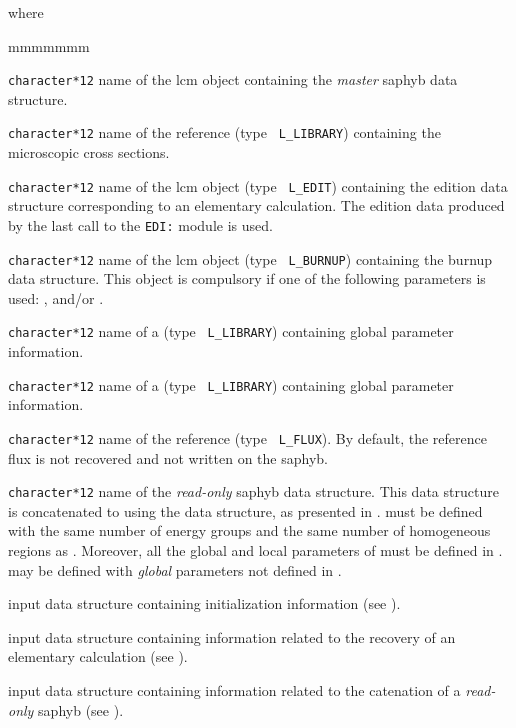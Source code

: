\noindent where
\begin{ListeDeDescription}{mmmmmmm}

\item[\dusa{SAPNAM}] {\tt character*12} name of the {\sc lcm} object containing the
{\sl master} {\sc saphyb} data structure.

\item[\dusa{HMIC}] {\tt character*12} name of the reference  (type {\tt
L\_LIBRARY}) containing the microscopic cross sections.

\item[\dusa{EDINAM}] {\tt character*12} name of the {\sc lcm} object (type {\tt
L\_EDIT}) containing the {\sc edition} data structure corresponding to an elementary
calculation. The {\sc edition} data produced by the last call to the {\tt EDI:} module
is used.

\item[\dusa{BRNNAM}] {\tt character*12} name of the {\sc lcm} object (type {\tt
L\_BURNUP}) containing the {\sc burnup} data structure. This object is compulsory if one
of the following parameters is used: ,  and/or .

\item[\dusa{HMIC1}] {\tt character*12} name of a  (type {\tt
L\_LIBRARY}) containing global parameter information.

\item[\dusa{HMIC2}] {\tt character*12} name of a  (type {\tt
L\_LIBRARY}) containing global parameter information.

\item[\dusa{FLUNAM}] {\tt character*12} name of the reference  (type {\tt
L\_FLUX}). By default, the reference flux is not recovered and not written on the {\sc saphyb}.

\item[\dusa{SAPRHS}] {\tt character*12} name of the {\sl read-only} {\sc saphyb} data structure. This
data structure is concatenated to  using the  data structure,
as presented in .  must be defined with the same number of energy
groups and the same number of homogeneous regions as . Moreover, all the
global and local parameters of  must be defined in . 
may be defined with {\sl global} parameters not defined in .

\item[\dusa{saphyb\_data1}] input data structure containing initialization information (see ).

\item[\dusa{saphyb\_data2}] input data structure containing information related to the recovery of an
elementary calculation (see ).

\item[\dusa{saphyb\_data3}] input data structure containing information related to the catenation of a
{\sl read-only} {\sc saphyb} (see ).

\end{ListeDeDescription}


